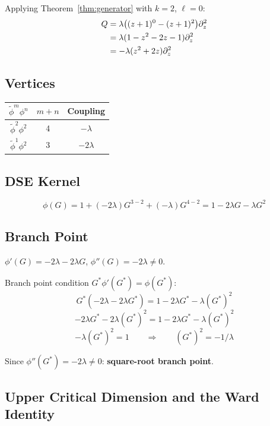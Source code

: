 \documentclass[11pt,a4paper]{article}
\theoremstyle{definition}
\newcommand{\phit}{\tilde{\phi}}
\begin{document}
Applying Theorem~\ref{thm:generator} with $k=2$, $\ell=0$:
\begin{align}
Q &= \lambda \bigl((z+1)^0 - (z+1)^2\bigr) \partial_z^2 \notag \\
  &= \lambda (1 - z^2 - 2z - 1) \partial_z^2 \notag \\
  &= -\lambda (z^2 + 2z) \partial_z^2
\end{align}

\subsection{Vertices}

\begin{center}
\begin{tabular}{ccc}
\toprule
$\phit^m \phi^n$ & $m+n$ & Coupling \\
\midrule
$\phit^2 \phi^2$ & 4 & $-\lambda$ \\
$\phit^1 \phi^2$ & 3 & $-2\lambda$ \\
\bottomrule
\end{tabular}
\end{center}

\subsection{DSE Kernel}

\begin{equation}
\phi(G) = 1 + (-2\lambda)G^{3-2} + (-\lambda)G^{4-2} = 1 - 2\lambda G - \lambda G^2
\end{equation}

\subsection{Branch Point}

$\phi'(G) = -2\lambda - 2\lambda G$, \; $\phi''(G) = -2\lambda \neq 0$.

Branch point condition $G^*\phi'(G^*) = \phi(G^*)$:
\[
G^*(-2\lambda - 2\lambda G^*) = 1 - 2\lambda G^* - \lambda (G^*)^2
\]
\[
-2\lambda G^* - 2\lambda (G^*)^2 = 1 - 2\lambda G^* - \lambda (G^*)^2
\]
\[
-\lambda (G^*)^2 = 1
\qquad\Longrightarrow\qquad
(G^*)^2 = -1/\lambda
\]

Since $\phi''(G^*) = -2\lambda \neq 0$: \textbf{square-root branch point}. \checkmark

\subsection{Upper Critical Dimension and the Ward Identity}
\end{document}
